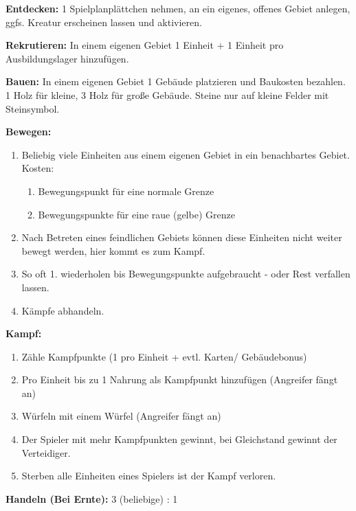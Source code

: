 \documentclass[fontsize=6pt]{scrreprt}
\begin{document}
  \textbf{Entdecken:}
  1 Spielplanplättchen nehmen, an ein eigenes, offenes Gebiet anlegen, ggfs. Kreatur erscheinen lassen und aktivieren.

  \textbf{Rekrutieren:}
  In einem eigenen Gebiet 1 Einheit + 1 Einheit pro Ausbildungslager hinzufügen.

  \textbf{Bauen:}
  In einem eigenen Gebiet 1 Gebäude platzieren und Baukosten bezahlen. 1 Holz für kleine, 3 Holz für große Gebäude. Steine nur auf kleine Felder mit Steinsymbol.

  \textbf{Bewegen:}
  \begin{enumerate}[topsep=1pt, partopsep=0pt, parsep=0pt, itemsep=0pt, leftmargin=12pt]
    \item Beliebig viele Einheiten aus einem eigenen Gebiet in ein benachbartes Gebiet. Kosten:
    \begin{enumerate}[label=\textbf{\arabic*x}, topsep=0pt, partopsep=0pt, parsep=0pt, itemsep=0pt, leftmargin=10pt]
      \item Bewegungspunkt für eine normale Grenze
      \item Bewegungspunkte für eine raue (gelbe) Grenze
    \end{enumerate}
    \item Nach Betreten eines feindlichen Gebiets können diese Einheiten nicht weiter bewegt werden, hier kommt es zum Kampf.
    \item So oft 1. wiederholen bis Bewegungspunkte aufgebraucht - oder Rest verfallen lassen.
    \item Kämpfe abhandeln.
  \end{enumerate}

  \textbf{Kampf:}
  \begin{enumerate}[topsep=1pt, partopsep=0pt, parsep=0pt, itemsep=0pt, leftmargin=12pt]
    \item Zähle Kampfpunkte (1 pro Einheit + evtl. Karten/ Gebäudebonus)
    \item Pro Einheit bis zu 1 Nahrung als Kampfpunkt hinzufügen (Angreifer fängt an)
    \item Würfeln mit einem Würfel (Angreifer fängt an)
    \item Der Spieler mit mehr Kampfpunkten gewinnt, bei Gleichstand gewinnt der Verteidiger.
    \item Sterben alle Einheiten eines Spielers ist der Kampf verloren.
  \end{enumerate}

  \textbf{Handeln (Bei Ernte):} 3 (beliebige) : 1
\end{document}
